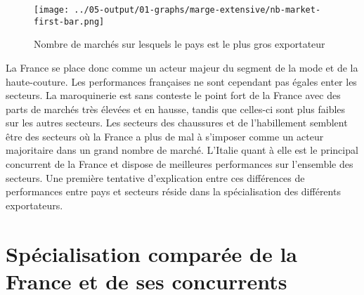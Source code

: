 \documentclass[french,10pt,a4paper]{article}
\begin{document}
\begin{figure}[!h]
  \centering  \texttt{[image: ../05-output/01-graphs/marge-extensive/nb-market-first-bar.png]}
  \caption{Nombre de marchés sur lesquels le pays est le plus gros exportateur}
  \label{fig:nb-market-first-bar}
\end{figure}

\medskip

La France se place donc comme un acteur majeur du segment de la mode et de la haute-couture. Les performances françaises ne sont cependant pas égales enter les secteurs. La maroquinerie est sans conteste le point fort de la France avec des parts de marchés très élevées et en hausse, tandis que celles-ci sont plus faibles sur les autres secteurs. Les secteurs des chaussures et de l'habillement semblent être des secteurs où la France a plus de mal à s'imposer comme un acteur majoritaire dans un grand nombre de marché. L'Italie quant à elle est le principal concurrent de la France et dispose de meilleures performances sur l'ensemble des secteurs. Une première tentative d'explication entre ces différences de performances entre pays et secteurs réside dans la spécialisation des différents exportateurs.

\section{Spécialisation comparée de la France et de ses concurrents}















\end{document}
